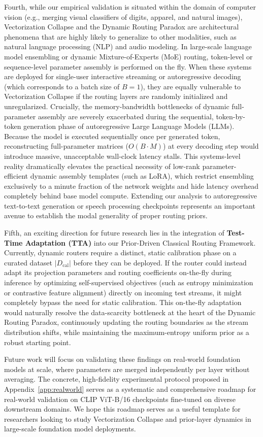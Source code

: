 Fourth, while our empirical validation is situated within the domain of computer vision (e.g., merging visual classifiers of digits, apparel, and natural images), Vectorization Collapse and the Dynamic Routing Paradox are architectural phenomena that are highly likely to generalize to other modalities, such as natural language processing (NLP) and audio modeling. In large-scale language model ensembling or dynamic Mixture-of-Experts (MoE) routing, token-level or sequence-level parameter assembly is performed on the fly. When these systems are deployed for single-user interactive streaming or autoregressive decoding (which corresponds to a batch size of $B=1$), they are equally vulnerable to Vectorization Collapse if the routing layers are randomly initialized and unregularized. Crucially, the memory-bandwidth bottlenecks of dynamic full-parameter assembly are severely exacerbated during the sequential, token-by-token generation phase of autoregressive Large Language Models (LLMs). Because the model is executed sequentially once per generated token, reconstructing full-parameter matrices ($O(B \cdot M)$) at every decoding step would introduce massive, unacceptable wall-clock latency stalls. This systems-level reality dramatically elevates the practical necessity of low-rank parameter-efficient dynamic assembly templates (such as LoRA), which restrict ensembling exclusively to a minute fraction of the network weights and hide latency overhead completely behind base model compute. Extending our analysis to autoregressive text-to-text generation or speech processing checkpoints represents an important avenue to establish the modal generality of proper routing priors.

Fifth, an exciting direction for future research lies in the integration of \textbf{Test-Time Adaptation (TTA)} into our Prior-Driven Classical Routing Framework. Currently, dynamic routers require a distinct, static calibration phase on a curated dataset $|D_{\text{cal}}|$ before they can be deployed. If the router could instead adapt its projection parameters and routing coefficients on-the-fly during inference by optimizing self-supervised objectives (such as entropy minimization or contrastive feature alignment) directly on incoming test streams, it might completely bypass the need for static calibration. This on-the-fly adaptation would naturally resolve the data-scarcity bottleneck at the heart of the Dynamic Routing Paradox, continuously updating the routing boundaries as the stream distribution shifts, while maintaining the maximum-entropy uniform prior as a robust starting point.

Future work will focus on validating these findings on real-world foundation models at scale, where parameters are merged independently per layer without averaging. The concrete, high-fidelity experimental protocol proposed in Appendix~\ref{app:realworld} serves as a systematic and comprehensive roadmap for real-world validation on CLIP ViT-B/16 checkpoints fine-tuned on diverse downstream domains. We hope this roadmap serves as a useful template for researchers looking to study Vectorization Collapse and prior-layer dynamics in large-scale foundation model deployments.
